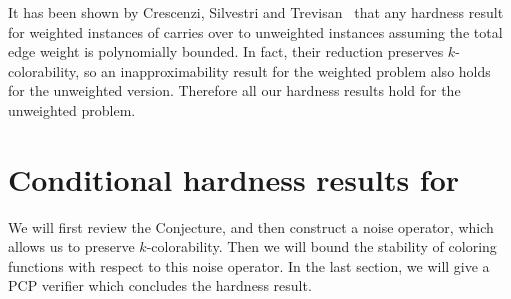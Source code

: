 \begin{remark}
\label{rem:wt-unwt}
  It has been shown by Crescenzi, Silvestri and Trevisan~\cite{CST01}
  that any hardness result for weighted instances of 
  carries over to  unweighted instances {assuming} the
  total edge weight is polynomially bounded. In fact, their reduction
  preserves $k$-colorability, so an inapproximability result for the weighted
   problem also holds for the unweighted version. Therefore
  all our hardness results hold for the unweighted  problem.
\end{remark}

\section{Conditional hardness results for }
%
We will first review the  Conjecture, and then construct a
noise operator, which allows us to preserve $k$-colorability. Then we
will bound the stability of coloring functions with respect to this
noise operator. In the last section, we will give a PCP verifier which
concludes the hardness result.
%
\vspace{-1ex}
